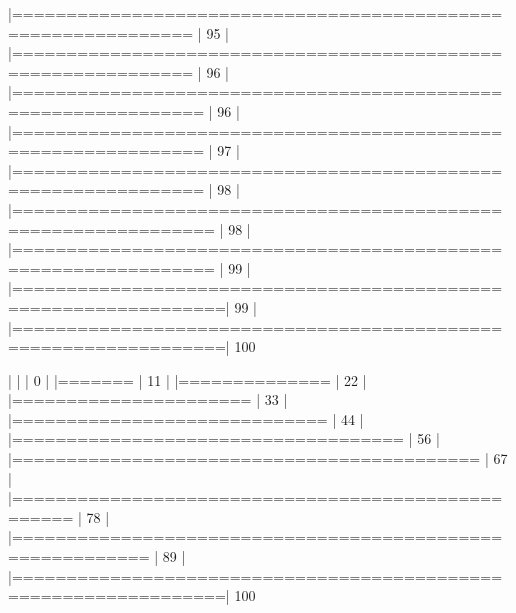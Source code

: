 \documentclass[10pt]{article}
\newenvironment{CodeChunk}{}{}
\begin{document}
\begin{CodeChunk}
\begin{CodeChunk}
\begin{CodeOutput}
  |==============================================================   |  95%
  |                                                                       
  |==============================================================   |  96%
  |                                                                       
  |===============================================================  |  96%
  |                                                                       
  |===============================================================  |  97%
  |                                                                       
  |===============================================================  |  98%
  |                                                                       
  |================================================================ |  98%
  |                                                                       
  |================================================================ |  99%
  |                                                                       
  |=================================================================|  99%
  |                                                                       
  |=================================================================| 100%

  |                                                                       
  |                                                                 |   0%
  |                                                                       
  |=======                                                          |  11%
  |                                                                       
  |==============                                                   |  22%
  |                                                                       
  |======================                                           |  33%
  |                                                                       
  |=============================                                    |  44%
  |                                                                       
  |====================================                             |  56%
  |                                                                       
  |===========================================                      |  67%
  |                                                                       
  |===================================================              |  78%
  |                                                                       
  |==========================================================       |  89%
  |                                                                       
  |=================================================================| 100%


\end{CodeOutput}
\end{CodeChunk}
\end{CodeChunk}
\end{document}
